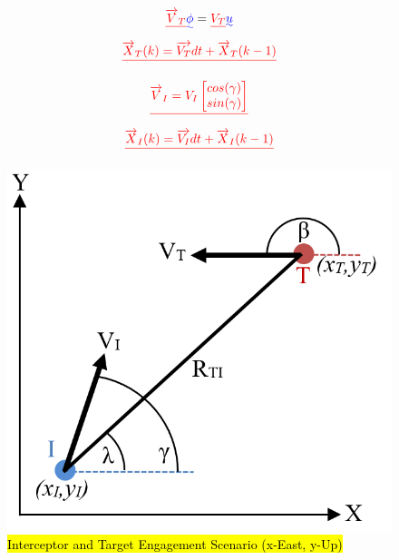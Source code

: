 \documentclass[conference]{IEEEtran}
\providecommand{\DIFadd}[1]{{\protect\color{blue}\uwave{#1}}} %
\providecommand{\DIFdel}[1]{{\protect\color{red}\sout{#1}}}                      %
\providecommand{\DIFaddbegin}{} %
\providecommand{\DIFaddend}{} %
\providecommand{\DIFdelbegin}{} %
\providecommand{\DIFdelend}{} %
\newcommand{\DIFscaledelfig}{0.5}
\newlength{\DIFdelgraphicswidth} %
\newlength{\DIFdelgraphicsheight} %
\newcommand{\DIFaddincludegraphics}[2][]{{\color{blue}\fbox{\DIFOincludegraphics[#1]{#2}}}} %
\newcommand{\DIFdelincludegraphics}[2][]{%
\sbox{\DIFdelgraphicsbox}{\DIFOincludegraphics[#1]{#2}}%
\settoboxwidth{\DIFdelgraphicswidth}{\DIFdelgraphicsbox} %
\settoboxtotalheight{\DIFdelgraphicsheight}{\DIFdelgraphicsbox} %
\scalebox{\DIFscaledelfig}{%
\parbox[b]{\DIFdelgraphicswidth}{\usebox{\DIFdelgraphicsbox}\\[-\baselineskip] \rule{\DIFdelgraphicswidth}{0em}}\llap{\resizebox{\DIFdelgraphicswidth}{\DIFdelgraphicsheight}{%
\setlength{\unitlength}{\DIFdelgraphicswidth}%
\begin{picture}(1,1)%
\thicklines\linethickness{2pt} %
{\color[rgb]{1,0,0}\put(0,0){\framebox(1,1){}}}%
{\color[rgb]{1,0,0}\put(0,0){\line( 1,1){1}}}%
{\color[rgb]{1,0,0}\put(0,1){\line(1,-1){1}}}%
\end{picture}%
}\hspace*{3pt}}} %
} %
\DeclareRobustCommand{\DIFaddbegin}{\DIFOaddbegin \let\includegraphics\DIFaddincludegraphics} %
\DeclareRobustCommand{\DIFaddend}{\DIFOaddend \let\includegraphics\DIFOincludegraphics} %
\DeclareRobustCommand{\DIFdelbegin}{\DIFOdelbegin \let\includegraphics\DIFdelincludegraphics} %
\DeclareRobustCommand{\DIFdelend}{\DIFOaddend \let\includegraphics\DIFOincludegraphics} %
\begin{document}
\begin{equation}\DIFdelbegin %
\DIFdel{\overrightarrow{V}_{T} }\DIFdelend \DIFaddbegin \label{eq:dubinsVel}
\DIFadd{\phi }\DIFaddend = \DIFdelbegin \DIFdel{V_{T} }%
\DIFdelend \DIFaddbegin \DIFadd{u
}\DIFaddend \end{equation}
 \DIFdelbegin \begin{displaymath}\DIFdel{%
\overrightarrow{X}_T(k) =  \overrightarrow{V_T}dt + \overrightarrow{X}_T(k-1) 
}\end{displaymath}
\DIFdelend 


\DIFdelbegin \begin{displaymath}\DIFdel{%
\overrightarrow{V}_{I} =  V_{I} \begin{bmatrix} cos(\gamma) \\ sin(\gamma) \end{bmatrix}
}\end{displaymath}
\begin{displaymath}\DIFdel{%
\overrightarrow{X}_I(k) =  \overrightarrow{V_I}dt + \overrightarrow{X}_I(k-1) 
}\end{displaymath}


\DIFdelend \begin{figure}[H]
	\centering
	\includegraphics[width=6 cm]{Engagement_Model.PNG}
	\caption{\hl{Interceptor and Target Engagement Scenario (x-East, y-Up)}}
	\label{fig:Egagement}
\end{figure}
\end{document}
